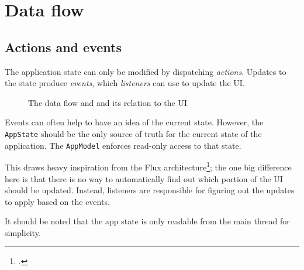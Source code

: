 \documentclass[12pt, a4paper]{article}
\begin{document}
\section{Data flow}

\subsection{Actions and events}

The application state can only be modified by dispatching \emph{actions}. Updates to the state produce \emph{events}, which \emph{listeners} can use to update the UI.

\begin{figure}[!h]

    \centering
    

    \caption{The data flow and and its relation to the UI}
    \label{fig:flow}

\end{figure}

Events can often help to have an idea of the current state. However, the \texttt{AppState} should be the only source of truth for the current state of the application. The \texttt{AppModel} enforces read-only access to that state.

This draws heavy inspiration from the Flux architecture\footcite{flux}; the one big difference here is that there is no way to automatically find out which portion of the UI should be updated. Instead, listeners are responsible for figuring out the updates to apply based on the events.

It should be noted that the app state is only readable from the main thread for simplicity. 
\end{document}
